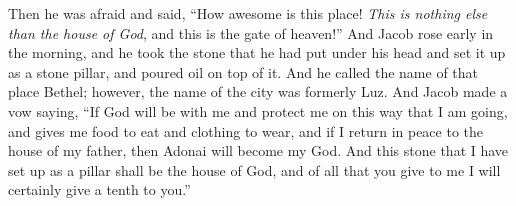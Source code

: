 \begin{biblechapter}
\verse Then he was afraid and said, “How awesome is this place! \textit{This is nothing else than the house of God}, and this is the gate of heaven!”
\verse And Jacob rose early in the morning, and he took the stone that he had put under his head and set it up as a stone pillar, and poured oil on top of it.
\verse And he called the name of that place Bethel; however, the name of the city was formerly Luz.
\verse And Jacob made a vow saying, “If God will be with me and protect me on this way that I am going, and gives me food to eat and clothing to wear,
\verse and if I return in peace to the house of my father, then Adonai will become my God.
\verse And this stone that I have set up as a pillar shall be the house of God, and of all that you give to me I will certainly give a tenth to you.”
\end{biblechapter}

